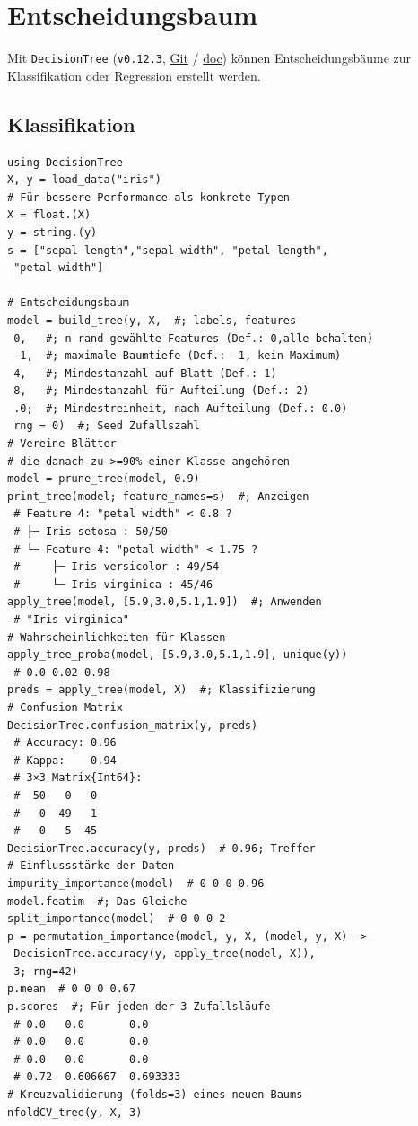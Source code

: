 \documentclass[10pt,twocolumn]{scrartcl}
\begin{document}
\section{Entscheidungsbaum}

Mit \lstinline|DecisionTree| (\lstinline|v0.12.3|,
\href{https://github.com/JuliaAI/DecisionTree.jl}{Git} /
\href{https://docs.juliahub.com/DecisionTree/pEDeB/0.12.3/}{doc}) können
Entscheidungsbäume zur Klassifikation oder Regression erstellt werden.

\subsection{Klassifikation}

\begin{lstlisting}
using DecisionTree
X, y = load_data("iris")
# Für bessere Performance als konkrete Typen
X = float.(X)
y = string.(y)
s = ["sepal length","sepal width", "petal length",
 "petal width"]

# Entscheidungsbaum
model = build_tree(y, X,  #; labels, features
 0,   #; n rand gewählte Features (Def.: 0,alle behalten)
 -1,  #; maximale Baumtiefe (Def.: -1, kein Maximum)
 4,   #; Mindestanzahl auf Blatt (Def.: 1)
 8,   #; Mindestanzahl für Aufteilung (Def.: 2)
 .0;  #; Mindestreinheit, nach Aufteilung (Def.: 0.0)
 rng = 0)  #; Seed Zufallszahl
# Vereine Blätter
# die danach zu >=90% einer Klasse angehören
model = prune_tree(model, 0.9)
print_tree(model; feature_names=s)  #; Anzeigen
 # Feature 4: "petal width" < 0.8 ?
 # ├─ Iris-setosa : 50/50
 # └─ Feature 4: "petal width" < 1.75 ?
 #     ├─ Iris-versicolor : 49/54
 #     └─ Iris-virginica : 45/46
apply_tree(model, [5.9,3.0,5.1,1.9])  #; Anwenden
 # "Iris-virginica"
# Wahrscheinlichkeiten für Klassen
apply_tree_proba(model, [5.9,3.0,5.1,1.9], unique(y))
 # 0.0 0.02 0.98
preds = apply_tree(model, X)  #; Klassifizierung
# Confusion Matrix
DecisionTree.confusion_matrix(y, preds)
 # Accuracy: 0.96
 # Kappa:    0.94
 # 3×3 Matrix{Int64}:
 #  50   0   0
 #   0  49   1
 #   0   5  45
DecisionTree.accuracy(y, preds)  # 0.96; Treffer
# Einflussstärke der Daten
impurity_importance(model)  # 0 0 0 0.96
model.featim  #; Das Gleiche
split_importance(model)  # 0 0 0 2
p = permutation_importance(model, y, X, (model, y, X) ->
 DecisionTree.accuracy(y, apply_tree(model, X)),
 3; rng=42)
p.mean  # 0 0 0 0.67
p.scores  #; Für jeden der 3 Zufallsläufe
 # 0.0   0.0       0.0
 # 0.0   0.0       0.0
 # 0.0   0.0       0.0
 # 0.72  0.606667  0.693333
# Kreuzvalidierung (folds=3) eines neuen Baums
nfoldCV_tree(y, X, 3)


\end{lstlisting}
\end{document}
